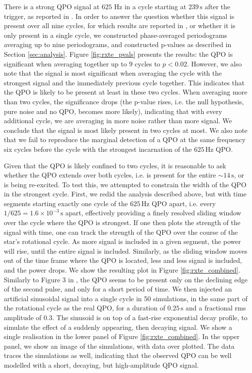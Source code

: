 \documentclass{emulateapj}
\begin{document}
There is a strong QPO signal at $625$ Hz in a cycle starting at $239\, \mathrm{s}$ after the trigger, as reported in \citet{Strohmayer06}. In order to answer the question whether this signal is present over all nine cycles, for which results are reported in \citet{Strohmayer05}, or whether it is only present in a single cycle, we constructed phase-averaged periodograms averaging up to nine periodograms, and constructed p-values as described in Section \ref{sec:analysis}. Figure \ref{fig:rxte_pvals} presents the results: the QPO is significant when averaging together up to $9$ cycles to $p < 0.02$. However, we also note that the signal is most significant when averaging the cycle with the strongest signal and the immediately previous cycle together. This indicates that the QPO is likely to be present at least in these two cycles. When averaging more than two cycles, the significance drops (the p-value rises, i.e. the null hypothesis, pure noise and no QPO, becomes more likely), indicating that with every additional cycle, we are averaging in more noise rather than more signal. We conclude that the signal is most likely present in two cycles at most.
We also note that we fail to reproduce the marginal detection of a QPO at the same frequency six cycles before the cycle with the strongest incarnation of the $625\, \mathrm{Hz}$ QPO. 

Given that the QPO is likely confined to two cycles, it is reasonable to ask whether the QPO extends over both cycles, i.e. is present for the entire $\sim 14\, \mathrm{s}$, or is being re-excited. To test this, we attempted to constrain the width of the QPO in the strongest cycle. First, we redid the analysis described above, but with time segments starting exactly one cycle of the $625 \, \mathrm{Hz}$ QPO apart, i.e. every $1/625 = 1.6 \times 10^{-3} \, \mathrm{s}$ apart, effectively providing a finely resolved sliding window over the cycle where the QPO is strongest. If one then plots the strength of the signal with time, one can track the strength of the QPO over the course of the star's rotational cycle. As more signal is included in a given segment, the power will rise, until the entire signal is included. Similarly, as the sliding window moves out of the time frame where the QPO is located, less and less signal is included, and the power drops. We show the resulting plot in Figure \ref{fig:rxte_combined}. Similarly to Figure 3 in \citet{Strohmayer06}, the QPO seems to be present only on the declining edge of the second pulse, and only for a short period of time. We then injected an artificial sinusoidal signal into a single cycle in 50 simulations, in the same part of the rotational cycle as the real QPO, for a duration of $0.25\, \mathrm{s}$ and a fractional rms amplitude of $0.3$. The sinusoid is on top of a fast-rise exponential decay profile, to simulate the effect of a suddenly appearing, then decaying signal. We show a single realisation in the lower panel of Figure \ref{fig:rxte_combined}. In the upper panel, we show an image of the simulations, with data over plotted. The data traces the simulations as well, indicating that the observed QPO can be well modelled with a short, decaying, but high-amplitude QPO signal. 
\end{document}
